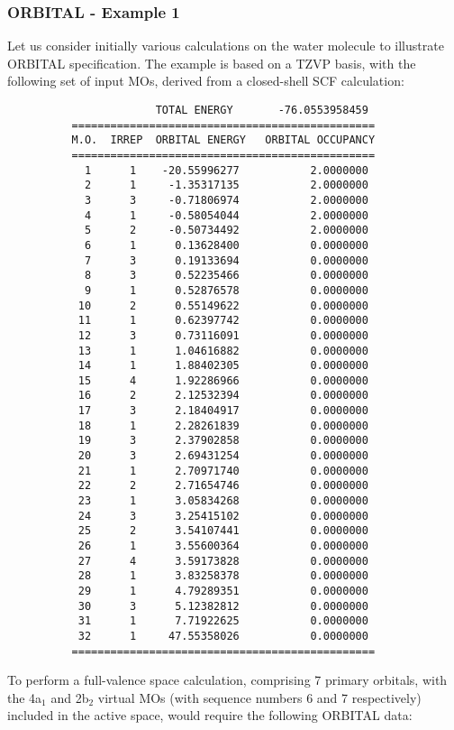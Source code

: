 \documentclass[11pt,fleqn]{article}
\begin{document}
\subsubsection{ORBITAL - Example 1}

Let us consider initially various calculations on the water
molecule to illustrate ORBITAL specification. The example
is based on a TZVP basis, with the following 
set of input MOs, derived from a closed-shell SCF
calculation:

{
\footnotesize
\begin{verbatim}
                       TOTAL ENERGY       -76.0553958459
          ===============================================
          M.O.  IRREP  ORBITAL ENERGY   ORBITAL OCCUPANCY
          ===============================================
            1      1    -20.55996277           2.0000000
            2      1     -1.35317135           2.0000000
            3      3     -0.71806974           2.0000000
            4      1     -0.58054044           2.0000000
            5      2     -0.50734492           2.0000000
            6      1      0.13628400           0.0000000
            7      3      0.19133694           0.0000000
            8      3      0.52235466           0.0000000
            9      1      0.52876578           0.0000000
           10      2      0.55149622           0.0000000
           11      1      0.62397742           0.0000000
           12      3      0.73116091           0.0000000
           13      1      1.04616882           0.0000000
           14      1      1.88402305           0.0000000
           15      4      1.92286966           0.0000000
           16      2      2.12532394           0.0000000
           17      3      2.18404917           0.0000000
           18      1      2.28261839           0.0000000
           19      3      2.37902858           0.0000000
           20      3      2.69431254           0.0000000
           21      1      2.70971740           0.0000000
           22      2      2.71654746           0.0000000
           23      1      3.05834268           0.0000000
           24      3      3.25415102           0.0000000
           25      2      3.54107441           0.0000000
           26      1      3.55600364           0.0000000
           27      4      3.59173828           0.0000000
           28      1      3.83258378           0.0000000
           29      1      4.79289351           0.0000000
           30      3      5.12382812           0.0000000
           31      1      7.71922625           0.0000000
           32      1     47.55358026           0.0000000
          ===============================================
\end{verbatim}
}
To perform a full-valence space calculation, comprising 7 primary
orbitals, with the 4a$_{1}$  and 2b$_{2}$ virtual
MOs (with sequence numbers 6 and 7  respectively) 
included in the active space, would require the
following ORBITAL data:
\end{document}
